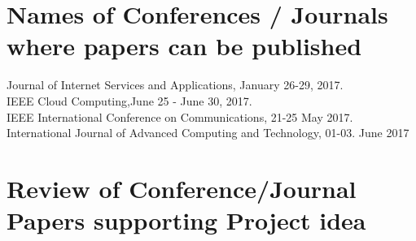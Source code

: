 \documentclass[oneside,a4paper,12pt]{report}
\begin{document}
\section{Names of Conferences / Journals where papers can be published}

Journal of Internet Services and Applications, January 26-29, 2017. \\
IEEE Cloud Computing,June 25 - June 30, 2017.\\
IEEE International Conference on Communications, 21-25 May 2017.\\
International Journal of Advanced Computing and Technology, 01-​03. ​June 2017\\


\section{Review of Conference/Journal Papers supporting Project idea}
\label{sec:survey}
\end{document}

